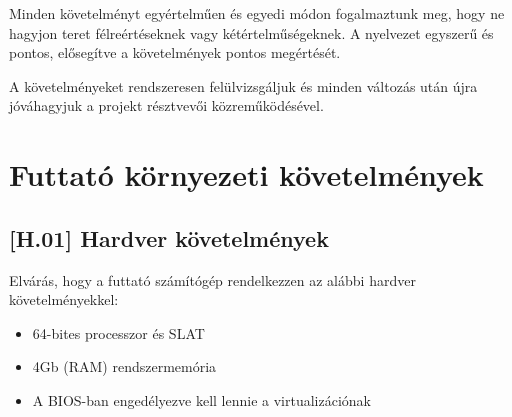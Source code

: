 \documentclass{scrreprt}
\begin{document}
Minden követelményt egyértelműen és egyedi módon fogalmaztunk meg, hogy ne hagyjon teret félreértéseknek vagy kétértelműségeknek. A nyelvezet egyszerű és
pontos, elősegítve a követelmények pontos megértését.

A követelményeket rendszeresen felülvizsgáljuk és minden változás után újra jóváhagyjuk a projekt résztvevői közreműködésével.

\section{Futtató környezeti követelmények}
\subsection{[H.01] Hardver követelmények} \label{H.01}
Elvárás, hogy a futtató számítógép rendelkezzen az alábbi hardver követelményekkel:
\begin{itemize}
      \item 64-bites processzor és SLAT
      \item 4Gb (RAM) rendszermemória
      \item A BIOS-ban engedélyezve kell lennie a virtualizációnak
\end{itemize}
\end{document}
